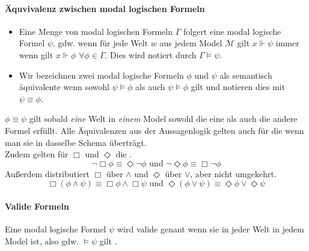 \paragraph{Äquvivalenz zwischen modal logischen Formeln} %
\label{par:gleichheit}
%
\begin{definition}
	\label{def:model_folgert}
	\begin{itemize}
		\item Eine Menge von modal logischen Formeln $\Gamma$ folgert eine modal logische Formel $\psi$, gdw. wenn für jede Welt $w$ aus jedem Model $\mathcal{M}$ gilt $x \Vdash \psi$ immer wenn gilt $x \Vdash \phi$ $\forall \phi \in \Gamma$. 
		Dies wird notiert durch $\Gamma \vDash \psi$.
		\item Wir bezeichnen zwei modal logische Formeln $\phi$ und $\psi$ als semantisch äquivalente wenn sowohl $\psi \vDash \phi$ als auch $\psi \vDash \phi$ gilt und notieren dies mit $\psi \equiv \phi$.\\
		\cite[S.313]{huth2004logic}
	\end{itemize}	
\end{definition}
%
$\phi \equiv \psi$ gilt sobald \emph{eine} Welt in \emph{einem} Model sowohl die eine als auch die andere Formel erfüllt.
Alle Äquivalenzen aus der Aussagenlogik gelten auch für die \ML wenn man sie in dasselbe Schema überträgt.\\
Zudem gelten für $\Box$ und $\Diamond$ die \deMorganRegeln.\\
\begin{equation}
	\neg \Box \phi \equiv \Diamond \neg \phi \text{ und } \neg \Diamond \phi \equiv \Box \neg \phi
\end{equation}
%
Außerdem distributiert $\Box$ über $\wedge$ und $\Diamond$ über $\vee$, aber nicht umgekehrt. \cite[S.314]{huth2004logic}
\begin{equation}
	\Box(\phi \wedge \psi) \equiv \Box \phi \wedge \Box \psi \text{ und }
	\Diamond(\phi \vee \psi) \equiv \Diamond \phi \vee \Diamond \psi
\end{equation}



\paragraph{Valide Formeln} %
\label{par:paragraph_name}

\begin{definition}
	\label{def:valide}
	Eine modal logische Formel $\psi$ wird valide genant wenn sie in jeder Welt in jedem Model \true ist, also gdw. $\vDash \psi$ gilt .
\end{definition}

